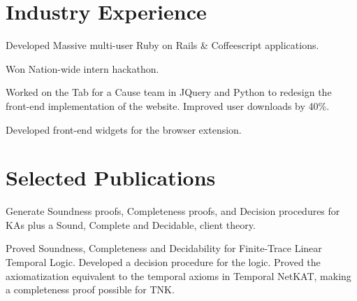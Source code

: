 \documentclass[]{deedy-resume-openfont}
\begin{document}
\begin{minipage}[t]{0.66\textwidth} 


\section{Industry Experience}

\vspace{\topsep} %
\begin{tightemize}
  \item Developed Massive multi-user Ruby on Rails \& Coffeescript applications.
  \item Won Nation-wide intern hackathon.
\end{tightemize}
\sectionsep

\begin{tightemize}
\item Worked on the Tab for a Cause team in JQuery and Python to redesign the front-end implementation of the website. Improved user downloads by 40\%.
\item Developed front-end widgets for the browser extension.\end{tightemize}


\section{Selected Publications}

Generate Soundness proofs, Completeness proofs, and Decision procedures for KAs plus a Sound, Complete and Decidable, client theory.
\sectionsep

Proved Soundness, Completeness and Decidability for Finite-Trace Linear Temporal Logic. Developed a decision procedure for the logic. Proved the axiomatization equivalent to the temporal axioms in Temporal NetKAT, making a completeness proof possible for TNK.
\sectionsep


\end{minipage}
\end{document}
